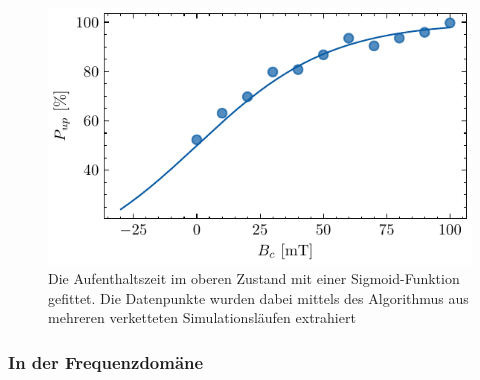 \documentclass[main.tex]{subfiles}
\begin{document}
\begin{figure}[H]
    \centering
    \includegraphics{bilder/plots/max_Bz/up_percentage_fit.pdf}
    \caption{Die Aufenthaltszeit im oberen Zustand mit einer Sigmoid-Funktion gefittet. Die Datenpunkte wurden dabei mittels des Algorithmus aus mehreren verketteten Simulationsläufen extrahiert}\label{fig:bz-up-percentage}
\end{figure}



\subsubsection{In der Frequenzdomäne}
\end{document}
